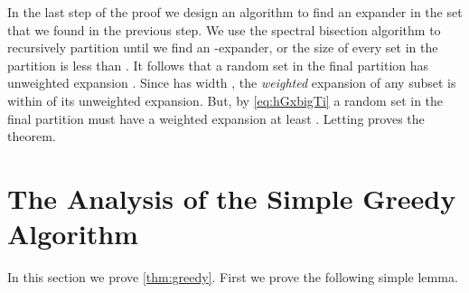 \documentclass[11pt]{article}
\begin{document}
In the last step of the proof we design an algorithm to find an expander  in the set  that we found in the previous step. We use the spectral bisection algorithm to recursively partition  until we find an -expander, or  the size of every set in the partition is less than . It follows that a random set in the final partition has  unweighted expansion . Since  has width , the \emph{weighted} expansion of any subset  is within  of its unweighted expansion. 
But, by  \eqref{eq:hGxbigTi} a random set in the final partition must have a weighted expansion at least . 
Letting  proves the theorem.
\section{The Analysis of the Simple Greedy Algorithm} 
\label{sec:greedy}
In this section we prove \autoref{thm:greedy}.
First we prove the following simple lemma.
\end{document}
